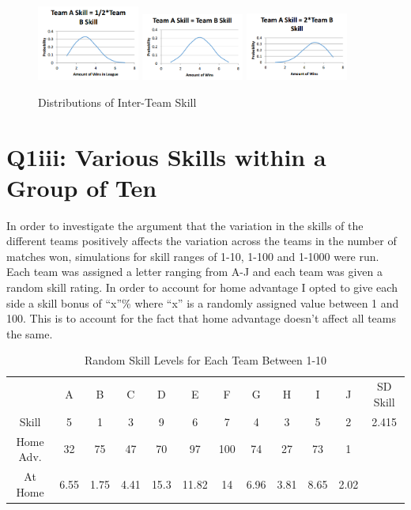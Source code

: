 \documentclass[12pt]{article}
\begin{document}
\begin{figure}[h]
\centering
\includegraphics[width=0.3\textwidth]{skill_a_half_skill_b.png}
\includegraphics[width=0.3\textwidth]{skill_a_equals_skill_b.png}
\includegraphics[width=0.3\textwidth]{skill_a_2x_skill_b.png}
\caption{Distributions of Inter-Team Skill}
\end{figure}

\section{Q1iii: Various Skills within a Group of Ten}
In order to investigate the argument that the variation in the skills of the different teams positively affects the variation across the teams in the number of matches won, simulations for skill ranges of 1-10, 1-100 and 1-1000 were run. Each team was assigned a letter ranging from A-J and each team was given a random skill rating. In order to account for home advantage I opted to give each side a skill bonus of “x”\% where “x” is a randomly assigned value between 1 and 100. This is to account for the fact that home advantage doesn’t affect all teams the same.

\begin{table}[h]
\centering
\begin{tabular}{cccccccccccc}
          & A    & B    & C    & D    & E     & F   & G    & H    & I    & J    & SD Skill \\
Skill     & 5    & 1    & 3    & 9    & 6     & 7   & 4    & 3    & 5    & 2    & 2.415    \\
Home Adv. & 32   & 75   & 47   & 70   & 97    & 100 & 74   & 27   & 73   & 1    &          \\
At Home   & 6.55 & 1.75 & 4.41 & 15.3 & 11.82 & 14  & 6.96 & 3.81 & 8.65 & 2.02 &         
\end{tabular}
\caption{Random Skill Levels for Each Team Between 1-10}
\end{table}
\end{document}
